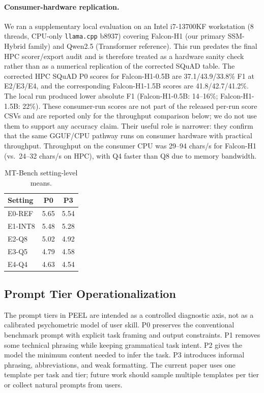 \documentclass[letterpaper]{article}
\begin{document}
\paragraph{Consumer-hardware replication.}
We ran a supplementary local evaluation on an Intel i7-13700KF workstation
(8 threads, CPU-only \texttt{llama.cpp} b8937) covering Falcon-H1 (our primary
SSM-Hybrid family) and Qwen2.5 (Transformer reference). This run predates the
final HPC scorer/export audit and is therefore treated as a hardware sanity
check rather than as a numerical replication of the corrected SQuAD table.
The corrected HPC SQuAD P0 scores for Falcon-H1-0.5B are 37.1/43.9/33.8\% F1
at E2/E3/E4, and the corresponding Falcon-H1-1.5B scores are
41.8/42.7/41.2\%. The local run produced lower absolute F1
(Falcon-H1-0.5B: 14--16\%; Falcon-H1-1.5B: 22\%). These consumer-run scores are
not part of the released per-run score CSVs and are reported only for the
throughput comparison below; we do not use them to support any accuracy claim.
Their useful role is narrower: they confirm that the
same GGUF/CPU pathway runs on consumer hardware with practical throughput.
Throughput on the consumer CPU was 29--94 chars/s for Falcon-H1 (vs.\
24--32 chars/s on HPC), with Q4 faster than Q8 due to memory bandwidth.
\begin{table}[t]
  \small\centering
  \caption{MT-Bench setting-level means.}
  \label{tab:app_mtbench_setting}
  \begin{tabular}{@{}lcc@{}}
    \toprule
    Setting & P0 & P3 \\
    \midrule
    E0-REF  & 5.65 & 5.54 \\
    E1-INT8 & 5.48 & 5.28 \\
    E2-Q8   & 5.02 & 4.92 \\
    E3-Q5   & 4.79 & 4.58 \\
    E4-Q4   & 4.63 & 4.54 \\
    \bottomrule
  \end{tabular}
\end{table}
\subsection{Prompt Tier Operationalization}

The prompt tiers in PEEL are intended as a controlled diagnostic axis, not
as a calibrated psychometric model of user skill. P0 preserves the conventional
benchmark prompt with explicit task framing and output constraints. P1 removes
some technical phrasing while keeping grammatical task intent. P2 gives the
model the minimum content needed to infer the task. P3 introduces informal
phrasing, abbreviations, and weak formatting. The current paper uses one
template per task and tier; future work should sample multiple templates per
tier or collect natural prompts from users.
\end{document}
